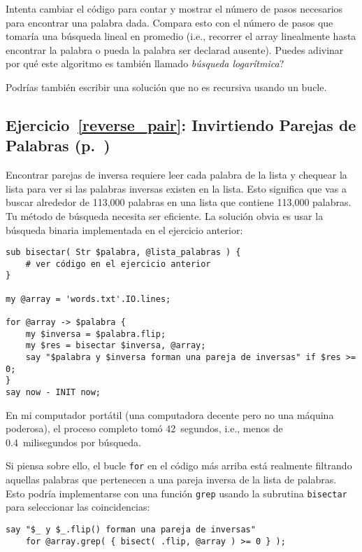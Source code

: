 Intenta cambiar el código para contar y mostrar el número
de pasos necesarios para encontrar una palabra dada. Compara
esto con el número de pasos que tomaría una búsqueda lineal
en promedio (i.e., recorrer el array linealmente hasta 
encontrar la palabra o pueda la palabra ser declarad ausente).
Puedes adivinar por qué este algoritmo es también 
llamado \emph{búsqueda logarítmica}?

Podrías también escribir una solución que no es recursiva usando
un bucle.


\subsection{Ejercicio~\ref{reverse_pair}: Invirtiendo Parejas de Palabras (p.~\pageref{reverse_pair})}
\label{sol_reverse_pair}

Encontrar parejas de inversa requiere leer cada palabra 
de la lista y chequear la lista para ver si las palabras
inversas existen en la lista. Esto significa que vas a buscar
alrededor de 113,000 palabras en una lista que contiene
113,000 palabras. Tu método de búsqueda necesita ser eficiente.
La solución obvia es usar la búsqueda binaria implementada en
el ejercicio anterior:

\begin{verbatim}
sub bisectar( Str $palabra, @lista_palabras ) {
    # ver código en el ejercicio anterior
}

my @array = 'words.txt'.IO.lines;

for @array -> $palabra {
    my $inversa = $palabra.flip;
    my $res = bisectar $inversa, @array;
    say "$palabra y $inversa forman una pareja de inversas" if $res >= 0;
}
say now - INIT now;
\end{verbatim}

En mi computador portátil (una computadora decente pero no una máquina
poderosa), el proceso completo tomó 42~segundos, i.e.,
menos de 0.4~milisegundos por búsqueda.

Si piensa sobre ello, el bucle {\tt for} en el código más
arriba está realmente filtrando aquellas palabras que 
pertenecen a una pareja inversa de la lista de palabras. 
Esto podría implementarse con una función {\tt grep} 
usando la subrutina {\tt bisectar} para seleccionar las
coincidencias:

\begin{verbatim}
say "$_ y $_.flip() forman una pareja de inversas" 
    for @array.grep( { bisect( .flip, @array ) >= 0 } );
\end{verbatim}

